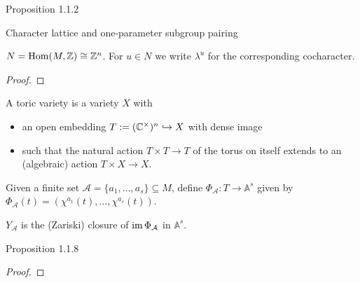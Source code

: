 \begin{proposition}
  \label{prop:1.1.2}
  Proposition 1.1.2
\end{proposition}

\begin{definition}
  \label{char_ops_pairing}
  Character lattice and one-parameter subgroup pairing
\end{definition}

\begin{proposition}
  $N = \operatorname{Hom}(M, {\mathbb Z}) \cong  {\mathbb Z}^n$. For $u \in N$ we write $\lambda^u$ for the corresponding cocharacter.
\end{proposition}
\begin{proof}
\end{proof}

\begin{definition}
  \label{ToricVariety}
  \leanok
  A toric variety is a variety $X$ with
  \begin{itemize}
    \item an open embedding $T := ({\mathbb C}^\times)^n \hookrightarrow X$ with dense image
    \item such that the natural action $T \times T \to T$ of the torus on itself extends to an (algebraic) action $T \times X \to X$.
  \end{itemize}
\end{definition}

\begin{definition}
  \label{phiA}
  Given a finite set $\mathcal A = \{a_1, \dotsc, a_s\} \subseteq M$, define $\Phi_{\mathcal{A}} : T \to \mathbb A^s$ given by $\Phi_{\mathcal A} (t) = (\chi^{a_1} (t), \dotsc, \chi^{a_s} (t))$.
\end{definition}

\begin{definition}
  \label{YA}
  $Y_{\mathcal{A}}$ is the (Zariski) closure of $\operatorname{im} \Phi_{\mathcal A}$ in $\mathbb A^s$.
\end{definition}

\begin{proposition}
  \label{prop:1.1.8}
  Proposition 1.1.8
\end{proposition}
\begin{proof}
\end{proof}

